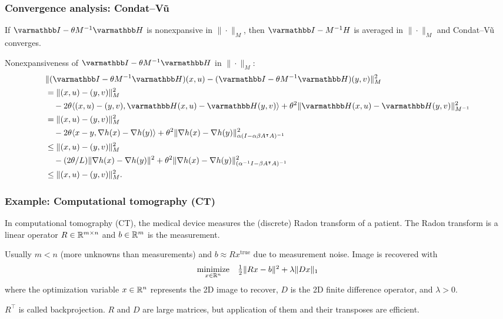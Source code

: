 \documentclass[10pt,mathserif]{beamer}
\begin{document}
\begin{frame}
\frametitle{Convergence analysis: Condat--V\~u}
If $\opI-\theta M^{-1}\opH$ is nonexpansive in $\|\cdot\|_M$, then $\opI- M^{-1}H$ is averaged in $\|\cdot\|_M$ and Condat--V\~u converges.
\vspace{0.2in}

Nonexpansiveness of $\opI-\theta M^{-1}\opH$ in $\|\cdot\|_M$:
\begin{align*}
&\|(\opI-\theta M^{-1}\opH)(x, u )-
(\opI-\theta M^{-1}\opH)(y,v )\|^2_M\\
&=
\|(x, u )-(y,v )\|^2_M\\
&\quad-2\theta
\langle (x, u )-(y,v ),
\opH(x, u )-\opH(y,v )\rangle
+
\theta^2\|\opH(x, u )-\opH(y,v )\|^2_{M^{-1}}\\
&=
\|(x, u )-(y,v )\|^2_M\\
&\quad-2\theta
\langle x-y,\nabla h(x)-\nabla h(y)\rangle
+
\theta^2\|\nabla h(x)-\nabla h(y)\|^2_{\alpha (I-\alpha\beta A^\intercal A)^{-1}}\\
&\le
\|(x, u )-(y,v )\|^2_M\\
&\quad-(2\theta/L)
\|\nabla h(x)-\nabla h(y)\|^2
+
\theta^2\|\nabla h(x)-\nabla h(y)\|^2_{(\alpha^{-1} I-\beta A^\intercal A)^{-1}}\\
&\le
\|(x, u )-(y,v )\|^2_M.%
\end{align*}
\end{frame}

\begin{frame}
\frametitle{Example: Computational tomography (CT)}
In computational tomography (CT), the medical device measures the (discrete) Radon transform of a patient.
The Radon transform is a linear operator $R\in \mathbb{R}^{m\times n}$ and $b\in \mathbb{R}^m$ is the measurement.


\vspace{0.2in}

Usually $m<n$ (more unknowns than measurements) and $b\approx Rx^\mathrm{true}$ due to measurement noise. 
Image is recovered with
\[
\begin{array}{ll}
\underset{x\in \mathbb{R}^n}{\mbox{minimize}}&
\frac{1}{2}\|Rx-b\|^2+\lambda \|Dx\|_1
\end{array}
\]
where the optimization variable $x\in \mathbb{R}^n$ represents the 2D image to recover,
$D$ is the 2D finite difference operator, and $\lambda>0$.

\vspace{0.2in}

$R^\intercal$ is called backprojection.
$R$ and $D$ are large matrices, but application of them and their transposes are efficient.
\end{frame}
\end{document}
